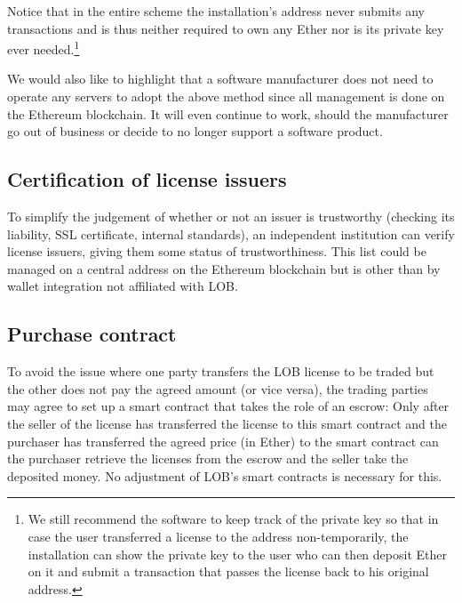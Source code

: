 \documentclass[a4paper]{article}
\begin{document}
Notice that in the entire scheme the installation's address never submits any transactions and is thus neither required to own any Ether nor is its private key ever needed.\footnote{We still recommend the software to keep track of the private key so that in case the user transferred a license to the address non-temporarily, the installation can show the private key to the user who can then deposit Ether on it and submit a transaction that passes the license back to his original address.}

We would also like to highlight that a software manufacturer does not need to operate any servers to adopt the above method since all management is done on the Ethereum blockchain. It will even continue to work, should the manufacturer go out of business or decide to no longer support a software product.





\subsection{Certification of license issuers}
\label{ch:licenseIssuerValidation}

To simplify the judgement of whether or not an issuer is trustworthy (checking its liability, SSL certificate, internal standards), an independent institution can verify license issuers, giving them some status of trustworthiness. This list could be managed on a central address on the Ethereum blockchain but is other than by wallet integration not affiliated with LOB.





\subsection{Purchase contract}
\label{ch:purchaseContract}

To avoid the issue where one party transfers the LOB license to be traded but the other does not pay the agreed amount (or vice versa), the trading parties may agree to set up a smart contract that takes the role of an escrow: Only after the seller of the license has transferred the license to this smart contract and the purchaser has transferred the agreed price (in Ether) to the smart contract can the purchaser retrieve the licenses from the escrow and the seller take the deposited money. No adjustment of LOB's smart contracts is necessary for this.
\end{document}
